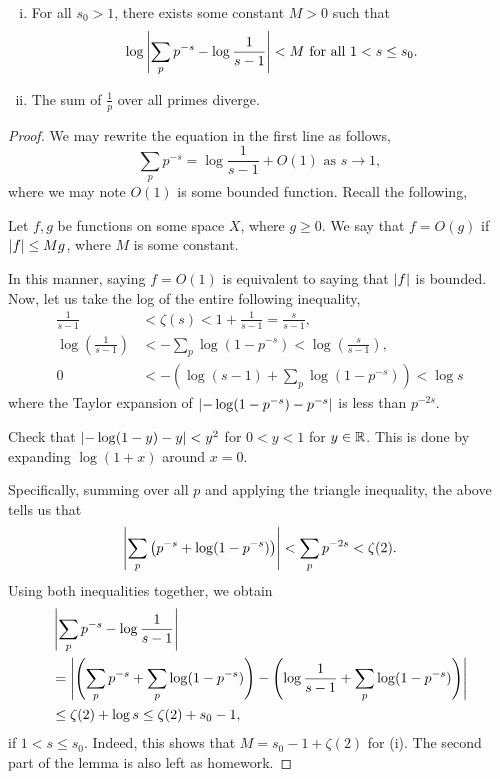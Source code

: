 \begin{lemma}
    \begin{enumerate}[(i)]
        \item For all $s_0 > 1$, there exists some constant $M > 0$ such that 
        \[ \log \left\lvert \sum_p p^{-s} - \log \frac{1}{s-1} \right\rvert < M \text{ for all } 1 < s \leq s_0. \]
        \item The sum of $\frac{1}{p}$ over all primes diverge.
    \end{enumerate}
\end{lemma}
\begin{proof}
    We may rewrite the equation in the first line as follows,
    \[ \sum_p p^{-s} = \log \frac{1}{s-1} + O(1) \text{ as } s \to 1, \]
    where we may note $O(1)$ is some bounded function. Recall the following,
    \begin{definition}
        Let $f, g$ be functions on some space $X$, where $g \geq 0$. We say that $f = O(g)$ if $\left\lvert f \right\rvert \leq M g$, where $M$ is some constant.
    \end{definition}
    \noindent In this manner, saying $f = O(1)$ is equivalent to saying that $\left\lvert f \right\rvert$ is bounded. Now, let us take the log of the entire following inequality,
    \begin{align*}
        \frac{1}{s-1} &< \zeta(s) < 1 + \frac{1}{s-1} = \frac{s}{s-1}, \\
        \log \left(\frac{1}{s-1}\right) &< - \sum_p \log(1 - p^{-s}) < \log \left(\frac{s}{s-1}\right), \tag{$\ast$} \\
        0 &< - \left(\log(s-1) + \sum_p \log(1 - p^{-s})\right) < \log s
    \end{align*}
    where the Taylor expansion of $\left\lvert - \log(1 - p^{-s}) - p^{-s} \right\rvert$ is less than $p^{-2s}$.
    \begin{exercise}
        Check that $\left\lvert - \log(1 - y) - y \right\rvert < y^2$ for $0 < y < 1$ for $y \in \mathbb R$. This is done by expanding $\log(1 + x)$ around $x = 0$.
    \end{exercise}
    \noindent Specifically, summing over all $p$ and applying the triangle inequality, the above tells us that
    \[ \left\lvert \sum_p \left(p^{-s} + \log(1 - p^{-s})\right) \right\rvert < \sum_p p^{-2s} < \zeta(2). \]
    Using both inequalities together, we obtain
    \begin{align*}
        & \left\lvert \sum_p p^{-s} - \log \frac{1}{s-1} \right\rvert \\
        &= \left\lvert \left(\sum_p p^{-s} + \sum_p \log (1 - p^{-s})\right) - \left(\log \frac{1}{s-1} + \sum_p \log (1 - p^{-s})\right) \right\rvert \\
        &\leq \zeta(2) + \log s \leq \zeta(2) + s_0 - 1,
    \end{align*}
    if $1 < s \leq s_0$. Indeed, this shows that $M = s_0 - 1 + \zeta(2)$ for (i). The second part of the lemma is also left as homework.
\end{proof}
